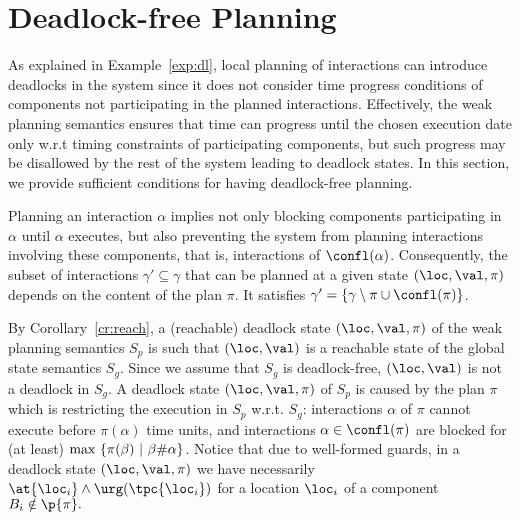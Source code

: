 \section{Deadlock-free Planning}\label{sec:3}
\vspace*{-1mm} As explained in Example~\ref{exp:dl}, local planning of interactions can 
  introduce deadlocks in the system since it does not consider time progress
  conditions of components not participating in the planned interactions. Effectively,
  the weak planning semantics ensures that time can progress until the chosen execution date only w.r.t
  timing constraints of participating components, but such progress may be disallowed by the rest of the system leading to deadlock states.
  In this section, we provide sufficient conditions for having deadlock-free planning.

  Planning an interaction $\alpha$ implies not only blocking components 
  participating in $\alpha$ until $\alpha$ executes, but also preventing the system from planning interactions
  involving these components, that is, interactions of $\confl(\alpha)$.
  Consequently, the subset of interactions $\gamma' \subseteq \gamma$ that can be planned at a given state $(\loc,\val,\pi)$ depends on the content of the plan $\pi$.
  It satisfies $\gamma'=\{\gamma\setminus\pi\cup\confl(\pi)\}$.

  By Corollary~\ref{cr:reach}, a (reachable) deadlock state $(\loc,\val,\pi)$ of the weak planning semantics $S_p$ is such that $(\loc,\val)$ is a reachable state of the global state semantics $S_g$.
  Since we assume that $S_g$ is deadlock-free, $(\loc,\val)$ is not a deadlock in $S_g$.
  A deadlock state $(\loc,\val,\pi)$ of $S_p$ is caused by the plan $\pi$ which
  is restricting the execution in $S_p$ w.r.t. $S_g$: interactions $\alpha$ of $\pi$ cannot execute before $\pi(\alpha)$ time units, and interactions $\alpha \in \confl(\pi)$ are blocked for (at least)
  $\textnormal{max } \{ \pi(\beta) \ | \ \beta\#\alpha \}$.
  Notice that due to well-formed guards, in a deadlock state $(\loc,\val,\pi)$ we have necessarily $\at{\loc_i} \wedge \urg(\tpc{\loc_i})$ for a location $\loc_i$ of a component $B_i \notin \p{\pi}.$ 

